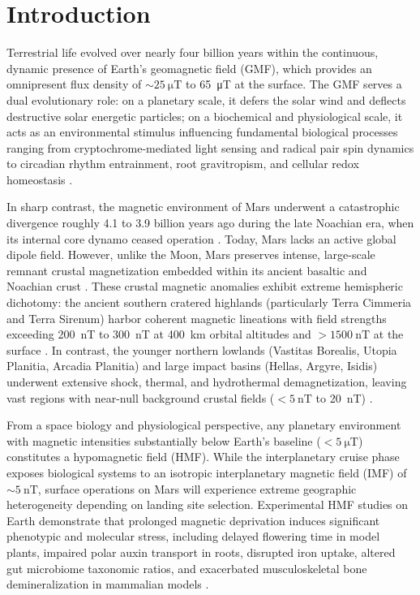 \section{Introduction}
\label{sec:intro}

Terrestrial life evolved over nearly four billion years within the continuous, dynamic presence of Earth's geomagnetic field (GMF), which provides an omnipresent flux density of $\sim\SI{25}{\micro\tesla}$ to \SI{65}{\micro\tesla} at the surface. The GMF serves a dual evolutionary role: on a planetary scale, it defers the solar wind and deflects destructive solar energetic particles; on a biochemical and physiological scale, it acts as an environmental stimulus influencing fundamental biological processes ranging from cryptochrome-mediated light sensing and radical pair spin dynamics to circadian rhythm entrainment, root gravitropism, and cellular redox homeostasis \citep{Maffei2014, Binhi2017, Hore2016}.

In sharp contrast, the magnetic environment of Mars underwent a catastrophic divergence roughly 4.1 to 3.9 billion years ago during the late Noachian era, when its internal core dynamo ceased operation \citep{Acuna1999, Connerney2005}. Today, Mars lacks an active global dipole field. However, unlike the Moon, Mars preserves intense, large-scale remnant crustal magnetization embedded within its ancient basaltic and Noachian crust \citep{Connerney2005, Langlais2019}. These crustal magnetic anomalies exhibit extreme hemispheric dichotomy: the ancient southern cratered highlands (particularly Terra Cimmeria and Terra Sirenum) harbor coherent magnetic lineations with field strengths exceeding \SI{200}{\nano\tesla} to \SI{300}{\nano\tesla} at \SI{400}{\kilo\meter} orbital altitudes and $> \SI{1500}{\nano\tesla}$ at the surface \citep{Acuna1999, Langlais2019}. In contrast, the younger northern lowlands (Vastitas Borealis, Utopia Planitia, Arcadia Planitia) and large impact basins (Hellas, Argyre, Isidis) underwent extensive shock, thermal, and hydrothermal demagnetization, leaving vast regions with near-null background crustal fields ($< \SI{5}{\nano\tesla}$ to \SI{20}{\nano\tesla}) \citep{Langlais2019, Morschhauser2014}.

From a space biology and physiological perspective, any planetary environment with magnetic intensities substantially below Earth's baseline ($< \SI{5}{\micro\tesla}$) constitutes a hypomagnetic field (HMF). While the interplanetary cruise phase exposes biological systems to an isotropic interplanetary magnetic field (IMF) of $\sim\SI{5}{\nano\tesla}$, surface operations on Mars will experience extreme geographic heterogeneity depending on landing site selection. Experimental HMF studies on Earth demonstrate that prolonged magnetic deprivation induces significant phenotypic and molecular stress, including delayed flowering time in model plants, impaired polar auxin transport in roots, disrupted iron uptake, altered gut microbiome taxonomic ratios, and exacerbated musculoskeletal bone demineralization in mammalian models \citep{Agliassa2018, Narayana2018, Narayana2021, Zhang2017, Xu2012, Mo2014}.

